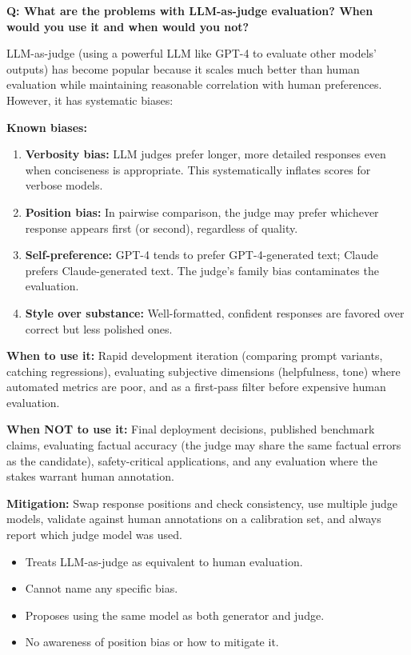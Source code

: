 \begin{interviewq}
\textbf{Q: What are the problems with LLM-as-judge evaluation? When would you
use it and when would you not?}

 \quad {} \quad \badgefreq{\freqmed}

\stronganswer
LLM-as-judge (using a powerful LLM like GPT-4 to evaluate other models' outputs)
has become popular because it scales much better than human evaluation while
maintaining reasonable correlation with human preferences.  However, it has
systematic biases:

\textbf{Known biases:}
\begin{enumerate}
    \item \textbf{Verbosity bias:} LLM judges prefer longer, more detailed
          responses even when conciseness is appropriate.  This systematically
          inflates scores for verbose models.
    \item \textbf{Position bias:} In pairwise comparison, the judge may prefer
          whichever response appears first (or second), regardless of quality.
    \item \textbf{Self-preference:} GPT-4 tends to prefer GPT-4-generated text;
          Claude prefers Claude-generated text.  The judge's family bias
          contaminates the evaluation.
    \item \textbf{Style over substance:} Well-formatted, confident responses are
          favored over correct but less polished ones.
\end{enumerate}

\textbf{When to use it:}  Rapid development iteration (comparing prompt
variants, catching regressions), evaluating subjective dimensions (helpfulness,
tone) where automated metrics are poor, and as a first-pass filter before
expensive human evaluation.

\textbf{When NOT to use it:}  Final deployment decisions, published benchmark
claims, evaluating factual accuracy (the judge may share the same factual errors
as the candidate), safety-critical applications, and any evaluation where the
stakes warrant human annotation.

\textbf{Mitigation:}  Swap response positions and check consistency, use
multiple judge models, validate against human annotations on a calibration set,
and always report which judge model was used.

\redflags
\begin{itemize}
    \item Treats LLM-as-judge as equivalent to human evaluation.
    \item Cannot name any specific bias.
    \item Proposes using the same model as both generator and judge.
    \item No awareness of position bias or how to mitigate it.
\end{itemize}


\end{interviewq}
